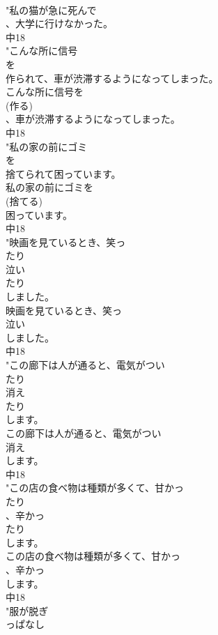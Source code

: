 \documentclass[8pt]{extreport}
\begin{document}
\begin{CJK}{UTF8}{min}
\\	"私の猫が急に死んで
\\	、大学に行けなかった。
\\	中18
\\	"こんな所に信号
\\	を
\\	作られて、車が渋滞するようになってしまった。
\\	こんな所に信号を
\\	(作る)
\\	、車が渋滞するようになってしまった。
\\	中18
\\	"私の家の前にゴミ
\\	を
\\	捨てられて困っています。
\\	私の家の前にゴミを
\\	(捨てる)
\\	困っています。
\\	中18
\\	"映画を見ているとき、笑っ
\\	たり
\\	泣い
\\	たり
\\	しました。
\\	映画を見ているとき、笑っ
\\	泣い
\\	しました。
\\	中18
\\	"この廊下は人が通ると、電気がつい
\\	たり
\\	消え
\\	たり
\\	します。
\\	この廊下は人が通ると、電気がつい
\\	消え
\\	します。
\\	中18
\\	"この店の食べ物は種類が多くて、甘かっ
\\	たり
\\	、辛かっ
\\	たり
\\	します。
\\	この店の食べ物は種類が多くて、甘かっ
\\	、辛かっ
\\	します。
\\	中18
\\	"服が脱ぎ
\\	っぱなし

\end{CJK}
\end{document}
